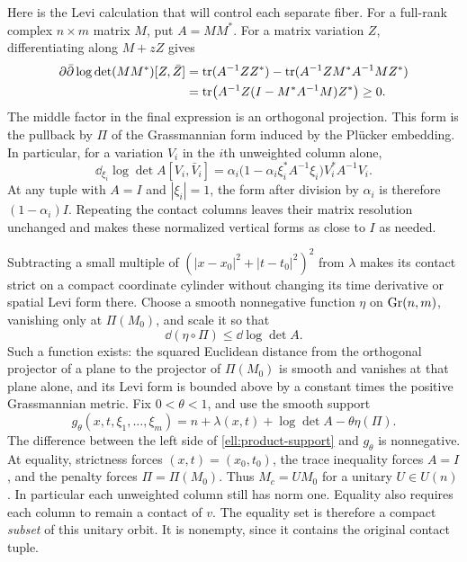 Here is the Levi calculation that will control each separate fiber.
For a full-rank complex $n\times m$ matrix $M$, put $A=MM^*$.
For a matrix variation $Z$, differentiating along $M+zZ$ gives
\begin{align}
 \partial\bar\partial\log\det(MM^*)[Z,\bar Z]
 &=\operatorname{tr}(A^{-1}ZZ^*)
   -\operatorname{tr}(A^{-1}ZM^*A^{-1}MZ^*) \notag\\
 &=\operatorname{tr}\bigl(A^{-1}Z(I-M^*A^{-1}M)Z^*\bigr)\ge0.
 \label{ell:rectangular-levi}
\end{align}
The middle factor in the final expression is an orthogonal projection.
This form is the pullback by $\Pi$ of the Grassmannian form induced
by the Pl\"ucker embedding.  In particular, for a variation $V_i$ in
the $i$th unweighted column alone,
\begin{equation}\label{ell:single-column}
 \dd_{\xi_i}\log\det A[V_i,\bar V_i]
 =\alpha_i\bigl(1-\alpha_i\xi_i^*A^{-1}\xi_i\bigr)
      V_i^*A^{-1}V_i.
\end{equation}
At any tuple with $A=I$ and $|\xi_i|=1$, the form after division by
$\alpha_i$ is therefore $(1-\alpha_i)I$.  Repeating the contact
columns leaves their matrix resolution unchanged and makes these
normalized vertical forms as close to $I$ as needed.

Subtracting a small multiple of
$(|x-x_0|^2+|t-t_0|^2)^2$ from $\lambda$ makes its contact strict on a compact
coordinate cylinder without changing its time derivative or spatial
Levi form there.  Choose a smooth nonnegative function $\eta$ on
$\operatorname{Gr}(n,m)$, vanishing only at $\Pi(M_0)$, and scale it so that
\begin{equation}\label{ell:grassmann-penalty}
 \dd(\eta\circ\Pi)\le\dd\log\det A.
\end{equation}
Such a function exists: the squared Euclidean distance from the
orthogonal projector of a plane to the projector of $\Pi(M_0)$ is
smooth and vanishes at that plane alone, and its Levi form is bounded
above by a constant times the positive Grassmannian metric.
Fix $0<\theta<1$, and use the smooth support
\begin{equation}\label{ell:localized-support}
 g_\theta(x,t,\xi_1,\ldots,\xi_m)
 =n+\lambda(x,t)+\log\det A-\theta\eta(\Pi).
\end{equation}
The difference between the left side of \eqref{ell:product-support}
and $g_\theta$ is nonnegative.  At equality, strictness forces
$(x,t)=(x_0,t_0)$, the trace inequality forces $A=I$, and the penalty
forces $\Pi=\Pi(M_0)$.  Thus $M_c=UM_0$ for a unitary $U\in U(n)$.
In particular each unweighted column still has norm one.  Equality
also requires each column to remain a contact of $v$.
The equality set is therefore a compact \emph{subset} of this unitary
orbit.  It is nonempty, since it contains the original contact tuple.

